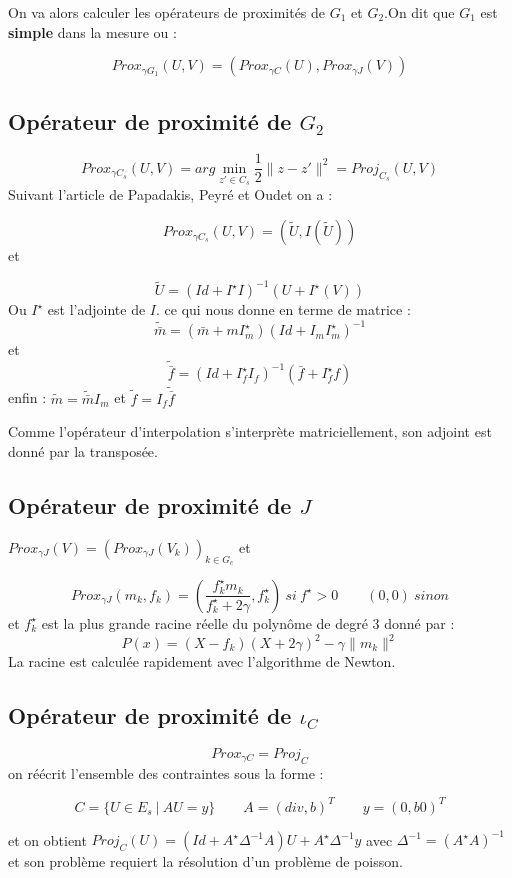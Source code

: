 \documentclass[a4paper,12pt]{article}
\begin{document}
On va alors calculer les opérateurs de proximités de $G_1$ et $G_2$.On dit que $G_1$ est \textbf{simple} dans la mesure ou : 

$$
Prox_{\gamma G_1} (U,V) = (Prox_{\gamma C} (U),Prox_{\gamma J} (V))
$$

\subsection{Opérateur de proximité de $G_2$}

$$
Prox_{\gamma C_s} (U,V) = arg\min_{z'\in C_s} \frac{1}{2}\|z-z'\|^2= Proj_{C_s}(U,V)
$$
Suivant l'article de Papadakis, Peyré et Oudet on a :

$$
Prox_{\gamma C_s} (U,V)  = (\tilde{U},I(\tilde{U}))
$$
et 

$$
\tilde{U} = (Id +I^{\star}I)^{-1}(U+I^{\star}(V))
$$
Ou $I^{\star}$ est l'adjointe de $I$. ce qui nous donne en terme de matrice : 
$$
\tilde{\bar{m}} = (\bar{m}+mI_m^{\star})(Id +I_mI_m^{\star})^{-1}
$$
et 
$$
\tilde{\bar{f}} = (Id +I_f^{\star}I_f)^{-1}(\bar{f}+I_f^{\star}f)
$$
enfin : $\tilde{m}=\tilde{\bar{m}}I_m$ et $\tilde{f}=I_f\tilde{\bar{f}}$

Comme l'opérateur d'interpolation s'interprète matriciellement, son adjoint est donné par la transposée. 

\subsection{Opérateur de proximité de $J$}

$Prox_{\gamma J}(V)=(Prox_{\gamma J}(V_k))_{k\in G_c}$ et 

$$
Prox_{\gamma J}(m_k,f_k) = (\frac{f^{\star}_km_k}{f^{\star}_k+2\gamma},f^{\star}_k)\ si\ f^{\star}>0 \qquad (0,0)\ sinon
$$ 
et $f^{\star}_k$ est la plus grande racine réelle du polynôme de degré 3 donné par : 
$$
P(x) = (X-f_k)(X+2\gamma)^2-\gamma \|m_k\|^2
$$
La racine est calculée rapidement avec l’algorithme de Newton. 

\subsection{Opérateur de proximité de $\iota_C$}

$$
Prox_{\gamma C} = Proj_C
$$
on réécrit l'ensemble des contraintes sous la forme : 

$$
C=\{U\in E_s\ | \ AU=y\} \qquad A=(div,b)^T \qquad y = (0,b0)^T
$$

et on obtient $Proj_C(U)=(Id +A^{\star}\Delta^{-1}A)U + A^{\star} \Delta^{-1}y$ avec $\Delta^{-1}=(A^{\star}A)^{-1}$ et son problème requiert la résolution d'un problème de poisson. 
\end{document}
